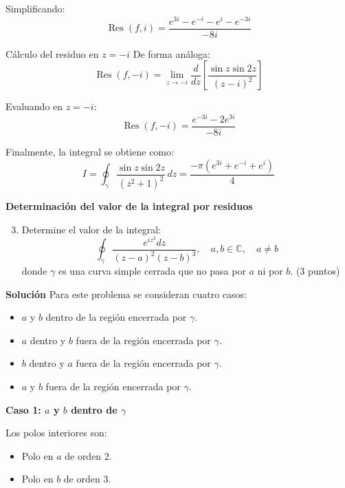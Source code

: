 \documentclass[a4paper,12pt]{article}
\begin{document}
Simplificando:
\begin{equation}
    \operatorname{Res}(f, i) = \frac{e^{3i} - e^{-i} - e^i - e^{-3i}}{-8i}  \nonumber
\end{equation}

Cálculo del residuo en $z = -i$
De forma análoga:
\begin{equation}
    \operatorname{Res}(f, -i) = \lim_{z \to -i} \frac{d}{dz} \left[ \frac{\sin z \sin 2z}{(z-i)^2} \right]  \nonumber
\end{equation}

Evaluando en $z = -i$:
\begin{equation}
    \operatorname{Res}(f, -i) = \frac{e^{-3i} - 2e^{3i}}{-8i}   \nonumber
\end{equation}

Finalmente, la integral se obtiene como:
\begin{equation}
    I = \oint_{\gamma} \frac{\sin z \sin 2z}{(z^2+1)^2} \,dz = \frac{-\pi \left(e^{3i} + e^{-i} + e^i \right)}{4}  \nonumber
\end{equation}

{\bf Determinación del valor de la integral por residuos}

\begin{enumerate}
  \setcounter{enumi}{2}
  \item Determine el valor de la integral:
  \begin{equation}
    \oint_{\gamma} \frac{e^{i z^{2}} dz}{(z-a)^{2}(z-b)^{3}}, \quad a, b \in \mathbb{C}, \quad a \neq b \nonumber
  \end{equation}
  donde $\gamma$ es una curva simple cerrada que no pasa por $a$ ni por $b$. (3 puntos)
\end{enumerate}

{\bf  Solución}
Para este problema se consideran cuatro casos:

\begin{itemize}
  \item $a$ y $b$ dentro de la región encerrada por $\gamma$.
  \item $a$ dentro y $b$ fuera de la región encerrada por $\gamma$.
  \item $b$ dentro y $a$ fuera de la región encerrada por $\gamma$.
  \item $a$ y $b$ fuera de la región encerrada por $\gamma$.
\end{itemize}

{\bf Caso 1: $a$ y $b$ dentro de $\gamma$}

Los polos interiores son:
\begin{itemize}
  \item Polo en $a$ de orden 2.
  \item Polo en $b$ de orden 3.
\end{itemize}
\end{document}
